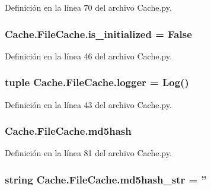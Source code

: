 Definición en la línea 70 del archivo Cache.\-py.

\hypertarget{class_cache_1_1_file_cache_a8582c66c170deb664f9e7cd78b21d6b1}{
\subsubsection[{is\-\_\-initialized}]{\setlength{\rightskip}{0pt plus 5cm}Cache.\-File\-Cache.\-is\-\_\-initialized = False\hspace{0.3cm}{\ttfamily [static]}}}\label{class_cache_1_1_file_cache_a8582c66c170deb664f9e7cd78b21d6b1}


Definición en la línea 46 del archivo Cache.\-py.

\hypertarget{class_cache_1_1_file_cache_a7ebf67b0706f9ce71f54cdfadacbfe2e}{
\subsubsection[{logger}]{\setlength{\rightskip}{0pt plus 5cm}tuple Cache.\-File\-Cache.\-logger = {\bf Log}()\hspace{0.3cm}{\ttfamily [static]}}}\label{class_cache_1_1_file_cache_a7ebf67b0706f9ce71f54cdfadacbfe2e}


Definición en la línea 43 del archivo Cache.\-py.

\hypertarget{class_cache_1_1_file_cache_a2b1c48cd0ee88344f405391545633787}{
\subsubsection[{md5hash}]{\setlength{\rightskip}{0pt plus 5cm}Cache.\-File\-Cache.\-md5hash}}\label{class_cache_1_1_file_cache_a2b1c48cd0ee88344f405391545633787}


Definición en la línea 81 del archivo Cache.\-py.

\hypertarget{class_cache_1_1_file_cache_a94712bab05ce67c5a20c3e2cfba47509}{
\subsubsection[{md5hash\-\_\-str}]{\setlength{\rightskip}{0pt plus 5cm}string Cache.\-File\-Cache.\-md5hash\-\_\-str = ''\hspace{0.3cm}{\ttfamily [static]}}}\label{class_cache_1_1_file_cache_a94712bab05ce67c5a20c3e2cfba47509}


